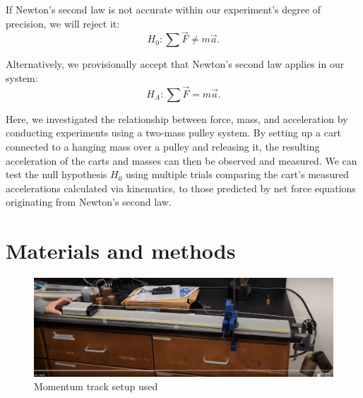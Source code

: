 \documentclass[reprint,amsmath,amssymb,aps]{revtex4-2}
\begin{document}
If Newton’s second law is not accurate within our experiment's degree of precision, we will reject it:
\begin{equation} 
    H_0: \sum\vec{F} \neq m\vec{a}.
    \label{eq:1}
\end{equation}

Alternatively, we provisionally accept that Newton’s second law applies in our system:
\begin{equation} 
    H_A: \sum\vec{F} = m\vec{a}.
    \label{eq:n2l}
\end{equation}

Here, we investigated the relationship between force, mass, and acceleration by conducting experiments using a two-mass pulley system. By setting up a cart connected to a hanging mass over a pulley and releasing it, the resulting acceleration of the carts and masses can then be observed and measured. We can test the null hypothesis $H_0$ using multiple trials comparing the cart's measured accelerations calculated via kinematics, to those predicted by net force equations originating from Newton's second law.








\section{Materials and methods}\label{sec:methods}
\begin{figure}%
\begin{center}
\includegraphics[width=\columnwidth]{SetupPicture.png}
\end{center}    
\caption{Momentum track setup used}
\label{fig:1}
\end{figure}
\end{document}
